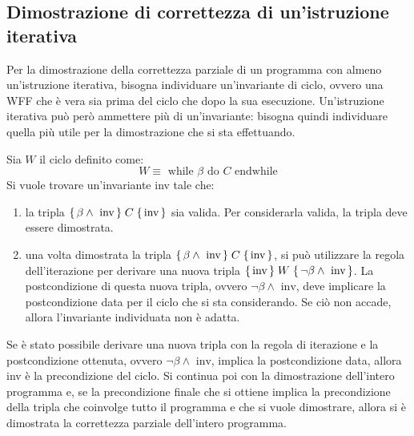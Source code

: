 \subsection*{Dimostrazione di correttezza di un'istruzione iterativa}
Per la dimostrazione della correttezza parziale di un programma
con almeno un'istruzione iterativa, bisogna individuare
un'invariante di ciclo, ovvero una WFF che è vera sia prima del ciclo
che dopo la sua esecuzione.
Un'istruzione iterativa può però ammettere più di un'invariante: bisogna
quindi individuare quella più utile per la dimostrazione che si sta effettuando.

Sia $W$ il ciclo definito come:
\[
    W \equiv \text{ while } \beta \text{ do } C \text{ endwhile}
\]
Si vuole trovare un'invariante inv tale che:
\begin{enumerate}
    \item la tripla $\Hoaretriple{\beta \land \text{ inv}}{C}{\text{inv}}$
    sia valida. Per considerarla valida, la tripla deve essere dimostrata.
    \item una volta dimostrata la tripla
    $\Hoaretriple{\beta \land \text{ inv}}{C}{\text{inv}}$, si può utilizzare
    la regola dell'iterazione per derivare una nuova tripla
    $\Hoaretriple{\text{inv}}{W}{\lnot \beta \land \text{ inv}}$.
    La postcondizione di questa nuova tripla, ovvero
    $\lnot \beta \land \text{ inv}$, deve implicare la postcondizione
    data per il ciclo che si sta considerando. Se ciò non accade, allora
    l'invariante individuata non è adatta.
\end{enumerate}
Se è stato possibile derivare una nuova tripla con la regola di
iterazione e la postcondizione ottenuta, ovvero $\lnot \beta \land \text{ inv}$,
implica la postcondizione data, allora inv è la precondizione del ciclo.
Si continua poi con la dimostrazione dell'intero programma e, se la precondizione
finale che si ottiene implica la precondizione della tripla che coinvolge
tutto il programma e che si vuole dimostrare, allora si è dimostrata la correttezza
parziale dell'intero programma.

